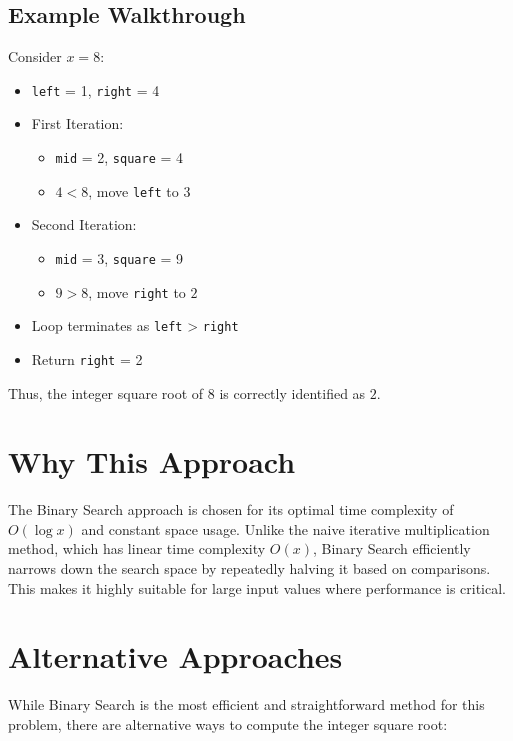 \subsection*{Example Walkthrough}

Consider \(x = 8\):

\begin{itemize}
    \item \texttt{left} = 1, \texttt{right} = 4
    \item First Iteration:
    \begin{itemize}
        \item \texttt{mid} = 2, \texttt{square} = 4
        \item \(4 < 8\), move \texttt{left} to \(3\)
    \end{itemize}
    \item Second Iteration:
    \begin{itemize}
        \item \texttt{mid} = 3, \texttt{square} = 9
        \item \(9 > 8\), move \texttt{right} to \(2\)
    \end{itemize}
    \item Loop terminates as \texttt{left} > \texttt{right}
    \item Return \texttt{right} = 2
\end{itemize}

Thus, the integer square root of \(8\) is correctly identified as \(2\).

\section*{Why This Approach}

The Binary Search approach is chosen for its optimal time complexity of \(O(\log x)\) and constant space usage. Unlike the naive iterative multiplication method, which has linear time complexity \(O(x)\), Binary Search efficiently narrows down the search space by repeatedly halving it based on comparisons. This makes it highly suitable for large input values where performance is critical.

\section*{Alternative Approaches}

While Binary Search is the most efficient and straightforward method for this problem, there are alternative ways to compute the integer square root:

